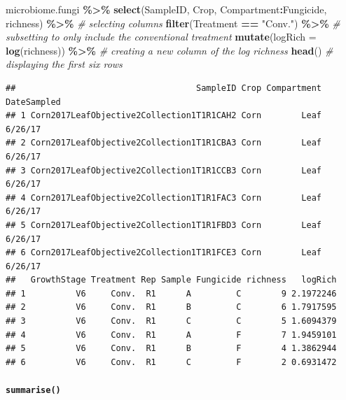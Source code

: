 \documentclass[
]{article}
\newenvironment{Shaded}{\begin{snugshade}}{\end{snugshade}}
\newcommand{\AttributeTok}[1]{\textcolor[rgb]{0.13,0.29,0.53}{#1}}
\newcommand{\CommentTok}[1]{\textcolor[rgb]{0.56,0.35,0.01}{\textit{#1}}}
\newcommand{\FunctionTok}[1]{\textcolor[rgb]{0.13,0.29,0.53}{\textbf{#1}}}
\newcommand{\NormalTok}[1]{#1}
\newcommand{\SpecialCharTok}[1]{\textcolor[rgb]{0.81,0.36,0.00}{\textbf{#1}}}
\newcommand{\StringTok}[1]{\textcolor[rgb]{0.31,0.60,0.02}{#1}}
\begin{document}
\begin{Shaded}
\begin{Highlighting}[]
\NormalTok{microbiome.fungi }\SpecialCharTok{\%\textgreater{}\%}
  \FunctionTok{select}\NormalTok{(SampleID, Crop, Compartment}\SpecialCharTok{:}\NormalTok{Fungicide, richness) }\SpecialCharTok{\%\textgreater{}\%} \CommentTok{\# selecting columns}
  \FunctionTok{filter}\NormalTok{(Treatment }\SpecialCharTok{==} \StringTok{"Conv."}\NormalTok{) }\SpecialCharTok{\%\textgreater{}\%} \CommentTok{\# subsetting to only include the conventional treatment}
  \FunctionTok{mutate}\NormalTok{(}\AttributeTok{logRich =} \FunctionTok{log}\NormalTok{(richness)) }\SpecialCharTok{\%\textgreater{}\%} \CommentTok{\# creating a new column of the log richness}
  \FunctionTok{head}\NormalTok{() }\CommentTok{\# displaying the first six rows}
\end{Highlighting}
\end{Shaded}

\begin{verbatim}
##                                    SampleID Crop Compartment DateSampled
## 1 Corn2017LeafObjective2Collection1T1R1CAH2 Corn        Leaf     6/26/17
## 2 Corn2017LeafObjective2Collection1T1R1CBA3 Corn        Leaf     6/26/17
## 3 Corn2017LeafObjective2Collection1T1R1CCB3 Corn        Leaf     6/26/17
## 4 Corn2017LeafObjective2Collection1T1R1FAC3 Corn        Leaf     6/26/17
## 5 Corn2017LeafObjective2Collection1T1R1FBD3 Corn        Leaf     6/26/17
## 6 Corn2017LeafObjective2Collection1T1R1FCE3 Corn        Leaf     6/26/17
##   GrowthStage Treatment Rep Sample Fungicide richness   logRich
## 1          V6     Conv.  R1      A         C        9 2.1972246
## 2          V6     Conv.  R1      B         C        6 1.7917595
## 3          V6     Conv.  R1      C         C        5 1.6094379
## 4          V6     Conv.  R1      A         F        7 1.9459101
## 5          V6     Conv.  R1      B         F        4 1.3862944
## 6          V6     Conv.  R1      C         F        2 0.6931472
\end{verbatim}

\paragraph{\texorpdfstring{\texttt{summarise()}}{summarise()}}\label{summarise}
\end{document}
